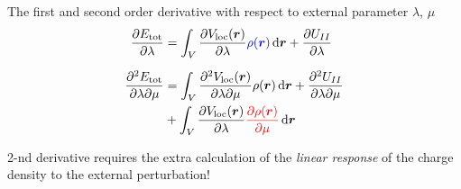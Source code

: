 \begin{frame}
  The first and second order derivative with respect to external parameter
  $\lambda$, $\mu$
   \begin{align}
    \frac{
      \partial E_{\text{tot}}
    }{
      \partial \lambda
    }
    &=
    \int_V
    \frac{
      \partial
      V_{\text{loc}}(\boldsymbol{r})
    }{
      \partial \lambda
    }
    \mathcolor{blue}{\rho(\boldsymbol{r})}
    \,\mathrm{d}\boldsymbol{r}
    +
    \frac{
      \partial
      U_{II}
    }{
      \partial \lambda
    } \label{eq:energy_1st_deriv}
    \\[6pt]
    \frac{
      \partial^2 E_{\text{tot}}
    }{
      \partial \lambda
      \partial \mu
    }
    &=
    \int_V
    \frac{
      \partial^2
      V_{\text{loc}}(\boldsymbol{r})
    }{
      \partial \lambda
      \partial \mu
    }
    \rho(\boldsymbol{r}) \,\mathrm{d}\boldsymbol{r}
    +
    \frac{
      \partial^2 U_{II}
    }{
      \partial \lambda
      \partial \mu
    } \nonumber \\
    & +
    \int_V
    \frac{
      \partial
      V_{\text{loc}}(\boldsymbol{r})
    }{
      \partial \lambda
    }
    \mathcolor{red}{
      \frac{
        \partial
        \rho(\boldsymbol{r})
      }{
        \partial \mu
      }
    }
    \,\mathrm{d}\boldsymbol{r} \label{eq:energy_2nd_deriv}
  \end{align}

  2-nd derivative requires the extra calculation of the \textit{linear response}
  of the charge density to the external perturbation!

\end{frame}

